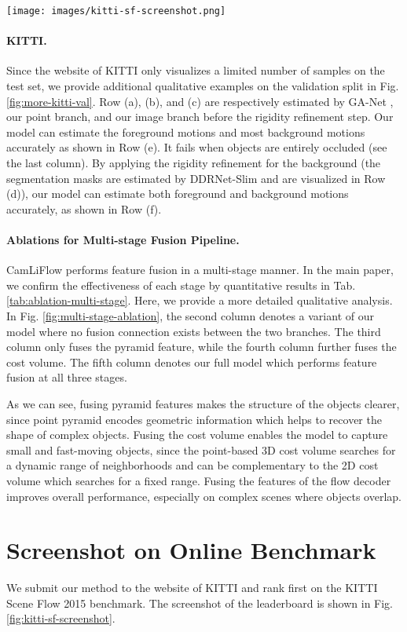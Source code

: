\documentclass[10pt,twocolumn,letterpaper]{article}
\begin{document}
\begin{figure*}
    \texttt{[image: images/kitti-sf-screenshot.png]}
    \caption{Screenshot of the KITTI Scene Flow 2015 benchmark on November 21th, 2021.}
    \label{fig:kitti-sf-screenshot}
\end{figure*}

\paragraph{KITTI.} Since the website of KITTI only visualizes a limited number of samples on the test set, we provide additional qualitative examples on the validation split in Fig. \ref{fig:more-kitti-val}. Row (a), (b), and (c) are respectively estimated by GA-Net \cite{zhang2019ganet}, our point branch, and our image branch before the rigidity refinement step. Our model can estimate the foreground motions and most background motions accurately as shown in Row (e). It fails when objects are entirely occluded (see the last column). By applying the rigidity refinement for the background (the segmentation masks are estimated by DDRNet-Slim \cite{hong2021ddrnet} and are visualized in Row (d)), our model can estimate both foreground and background motions accurately, as shown in Row (f).

\paragraph{Ablations for Multi-stage Fusion Pipeline.} CamLiFlow performs feature fusion in a multi-stage manner. In the main paper, we confirm the effectiveness of each stage by quantitative results in Tab. \ref{tab:ablation-multi-stage}. Here, we provide a more detailed qualitative analysis. In Fig. \ref{fig:multi-stage-ablation}, the second column denotes a variant of our model where no fusion connection exists between the two branches. The third column only fuses the pyramid feature, while the fourth column further fuses the cost volume. The fifth column denotes our full model which performs feature fusion at all three stages.

As we can see, fusing pyramid features makes the structure of the objects clearer, since point pyramid encodes geometric information which helps to recover the shape of complex objects. Fusing the cost volume enables the model to capture small and fast-moving objects, since the point-based 3D cost volume searches for a dynamic range of neighborhoods and can be complementary to the 2D cost volume which searches for a fixed range. Fusing the features of the flow decoder improves overall performance, especially on complex scenes where objects overlap.

\section{Screenshot on Online Benchmark}

We submit our method to the website of KITTI and rank first on the KITTI Scene Flow 2015 benchmark. The screenshot of the leaderboard is shown in Fig. \ref{fig:kitti-sf-screenshot}.
\end{document}
